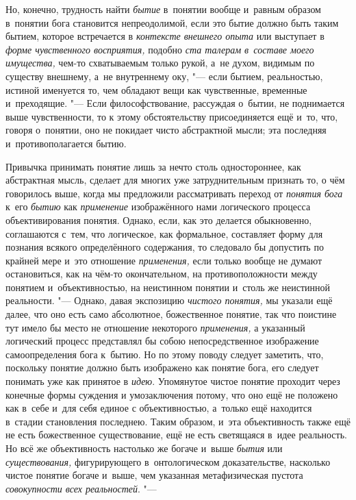 Но, конечно, трудность найти {\em бытие} в~понятии
вообще и~равным образом в~понятии бога становится непреодолимой, если это
бытие должно быть таким бытием, которое встречается в
{\em контексте внешнего опыта} или выступает в {\em форме
чувственного восприятия,} подобно {\em ста талерам в~составе моего
имущества,} чем-то схватываемым только рукой, а~не духом,
видимым по существу внешнему, а~не внутреннему оку, "--- если
бытием, реальностью, истиной именуется то, чем обладают вещи как
чувственные, временные и~преходящие. "--- Если
философствование, рассуждая о~бытии, не поднимается выше чувственности, то
к этому обстоятельству присоединяется ещё и~то, что, говоря о~понятии, оно
не покидает чисто абстрактной мысли; эта последняя и~противополагается бытию.

Привычка принимать понятие лишь за нечто столь одностороннее,
как абстрактная мысль, сделает для многих уже затруднительным признать то,
о чём говорилось выше, когда мы предложили рассматривать переход от
{\em понятия бога} к~его {\em бытию} как {\em применение}
изображённого нами логического процесса объективирования
понятия. Однако, если, как это делается обыкновенно, соглашаются с~тем, что
логическое, как формальное, составляет форму для познания всякого
определённого содержания, то следовало бы допустить по крайней мере и~это
отношение {\em применения,}
если только вообще не думают остановиться, как на чём-то
окончательном, на противоположности между понятием и~объективностью, на
неистинном понятии и~столь же неистинной реальности. "---
Однако, давая экспозицию {\em чистого понятия,} мы
указали ещё далее, что оно есть само абсолютное, божественное понятие, так
что поистине тут имело бы место не отношение некоторого {\em применения,} а
указанный логический процесс представлял бы собою непосредственное
изображение самоопределения бога к~бытию. Но по этому поводу следует
заметить, что, поскольку понятие должно быть изображено как понятие бога,
его следует понимать уже как принятое в {\em идею}. Упомянутое
чистое понятие проходит через конечные формы суждения и
умозаключения потому, что оно ещё не положено как в~себе и~для себя единое
с объективностью, а~только ещё находится в~стадии становления последнею.
Таким образом, и~эта объективность также ещё не есть божественное
существование, ещё не есть светящаяся в~идее реальность. Но всё же
объективность настолько же богаче и~выше {\em бытия} или {\em существования,}
фигурирующего в~онтологическом доказательстве, насколько
чистое понятие богаче и~выше, чем указанная метафизическая пустота
{\em совокупности всех реальностей}. "---
